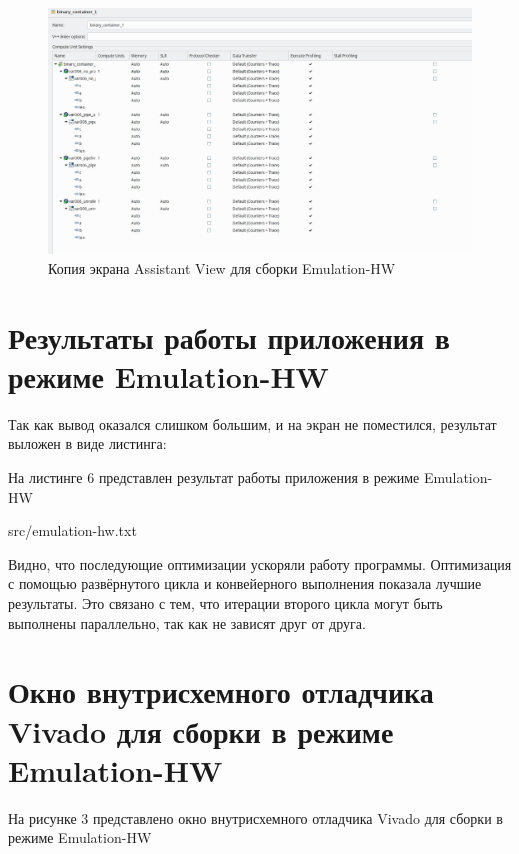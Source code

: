 \FloatBarrier
\begin{figure}[h]
	\begin{center}
		\includegraphics[width=\linewidth]{inc/assistant.png}
	\end{center}
	\caption{Копия экрана Assistant View для сборки Emulation-HW}
\end{figure}
\FloatBarrier

\section*{Результаты работы приложения в режиме \newline Emulation-HW}
Так как вывод оказался слишком большим, и на экран не поместился, результат выложен в виде листинга:

На листинге 6 представлен результат работы приложения в режиме Emulation-HW
\begin{lstinputlisting}[caption=Результат работы приложения в режиме Emulation-HW, 
	basicstyle=\footnotesize\ttfamily, frame=single,breaklines=true]{src/emulation-hw.txt}
\end{lstinputlisting}


Видно, что последующие оптимизации ускоряли работу программы.  
Оптимизация с помощью развёрнутого цикла и конвейерного выполнения показала лучшие результаты.
Это связано с тем, что итерации второго цикла могут быть выполнены параллельно, так как не зависят друг от друга.
\section*{Окно внутрисхемного отладчика Vivado для сборки в режиме Emulation-HW}
На рисунке 3 представлено окно внутрисхемного отладчика Vivado для сборки в режиме Emulation-HW

